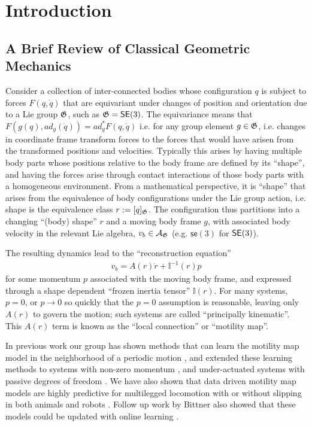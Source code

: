 \documentclass[conference]{IEEEtran}
\begin{document}
\section{Introduction}

\subsection{A Brief Review of Classical Geometric Mechanics}

Consider a collection of inter-connected bodies whose configuration $q$ is subject to forces $F(q,
\dot q)$ that are equivariant under changes of position and orientation due to a Lie group $\mathfrak{G}$, such as $\mathfrak{G}=\mathsf{SE}(3)$.
The equivariance means that $F( g(q), ad_g(\dot q) ) = ad^*_g F(q, \dot q)$ i.e. for any group element $g \in \mathfrak{G}$, i.e. changes in coordinate frame transform forces to the forces that would have arisen from the transformed positions and velocities.
Typically this arises by having multiple body parts whose positions relative to the body frame are defined by its ``shape'', and having the forces arise through contact interactions of those body parts with a homogeneous environment.
From a mathematical perspective, it is ``shape'' that arises from the equivalence of body configurations under the Lie group action, i.e. shape is the equivalence class $r := [q]_{\mathfrak{G}}$.
The configuration thus partitions into a changing ``(body) shape'' $r$ and a moving body frame $g$, with associated body velocity in the relevant Lie algebra, $v_b \in \mathcal{A}_{\mathfrak{G}}$ (e.g. $\mathsf{se}(3)$ for $\mathsf{SE}(3)$).

The resulting dynamics lead to the ``reconstruction equation''
\begin{align}
	v_b = A(r) \dot r + \mathbb{I}^{-1}(r) p
\end{align}
for some momentum $p$ associated with the moving body frame, and expressed through a shape dependent ``frozen inertia tensor'' $\mathbb{I}(r)$.
For many systems, $p=0$, or $p \to 0$ so quickly that the $p = 0$ assumption is reasonable, leaving only $A(r)$ to govern the motion; such systems are called ``principally kinematic''.
This $A(r)$ term is known as the ``local connection'' or ``motility map''.

In previous work our group has shown methods that can learn the motility map model in the neighborhood of a periodic motion , and extended these learning methods to systems with non-zero momentum , and under-actuated systems with passive degrees of freedom .
We have also shown that data driven motility map models are highly predictive for multilegged locomotion with or without slipping in both animals and robots .
Follow up work by Bittner also showed that these models could be updated with online learning .
\end{document}
